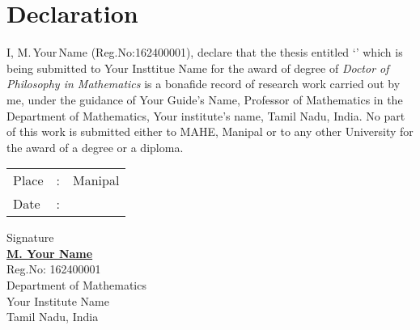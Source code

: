 

\chapter*{Declaration}

I, M.\,Your\,Name (Reg.No:162400001), declare that the thesis entitled `\emph{\printtitle}' which is being submitted to Your Insttitue Name for the award of degree of \emph{Doctor of Philosophy in Mathematics} is a bonafide record of research work carried out by me, under the guidance of Your Guide's Name, Professor of Mathematics in the Department of Mathematics, Your institute's name, Tamil Nadu, India.  No part of this work is submitted either to MAHE, Manipal or to any other University for the award of a degree or a diploma. 


 
 \vspace{3\baselineskip}
\noindent
{ 
	\begin{minipage}{0.49\textwidth}
		\raggedright 
		\begin{tabular}{lll}
			Place& :&  Manipal\\
			Date & :&  \underline{\hspace{2cm}}
		\end{tabular}
	\end{minipage}%
	\begin{minipage}{0.49\textwidth}
		\begin{center} 
			Signature\\[1cm]
				\href{Your profile url}{\bfseries  M. Your Name}\\
			Reg.No: 162400001\\
			Department of Mathematics\\
			Your Institute Name\\
			Tamil Nadu, India			
		\end{center}
	\end{minipage}
}

\clearpage


